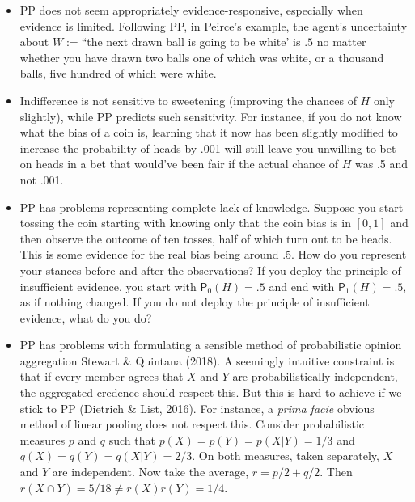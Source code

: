\documentclass[
  10pt,
  dvipsnames,enabledeprecatedfontcommands]{scrartcl}
\begin{document}
\begin{itemize}
\item
  \textsf{PP} does not seem appropriately evidence-responsive,
  especially when evidence is limited. Following \textsf{PP}, in
  Peirce's example, the agent's uncertainty about \(W:=\)``the next
  drawn ball is going to be white' is \(.5\) no matter whether you have
  drawn two balls one of which was white, or a thousand balls, five
  hundred of which were white.
\item
  Indifference is not sensitive to sweetening (improving the chances of
  \(H\) only slightly), while \textsf{PP} predicts such sensitivity. For
  instance, if you do not know what the bias of a coin is, learning that
  it now has been slightly modified to increase the probability of heads
  by .001 will still leave you unwilling to bet on heads in a bet that
  would've been fair if the actual chance of \(H\) was .5 and not .001.
\item
  \textsf{PP} has problems representing complete lack of knowledge.
  Suppose you start tossing the coin starting with knowing only that the
  coin bias is in \([0,1]\) and then observe the outcome of ten tosses,
  half of which turn out to be heads. This is some evidence for the real
  bias being around .5. How do you represent your stances before and
  after the observations? If you deploy the principle of insufficient
  evidence, you start with \(\mathsf{P}_0(H)=.5\) and end with
  \(\mathsf{P}_1(H)=.5\), as if nothing changed. If you do not deploy
  the principle of insufficient evidence, what do you do?
\item
  \textsf{PP} has problems with formulating a sensible method of
  probabilistic opinion aggregation Stewart \& Quintana (2018). A
  seemingly intuitive constraint is that if every member agrees that
  \(X\) and \(Y\) are probabilistically independent, the aggregated
  credence should respect this. But this is hard to achieve if we stick
  to PP (Dietrich \& List, 2016). For instance, a \emph{prima facie}
  obvious method of linear pooling does not respect this. Consider
  probabilistic measures \(p\) and \(q\) such that
  \(p(X) = p(Y) = p(X\vert Y) = 1/3\) and
  \(q(X) = q(Y) = q(X\vert Y) = 2/3\). On both measures, taken
  separately, \(X\) and \(Y\) are independent. Now take the average,
  \(r=p/2+q/2\). Then \(r(X\cap Y) = 5/18 \neq r(X)r(Y)=1/4\).
\end{itemize}
\end{document}
